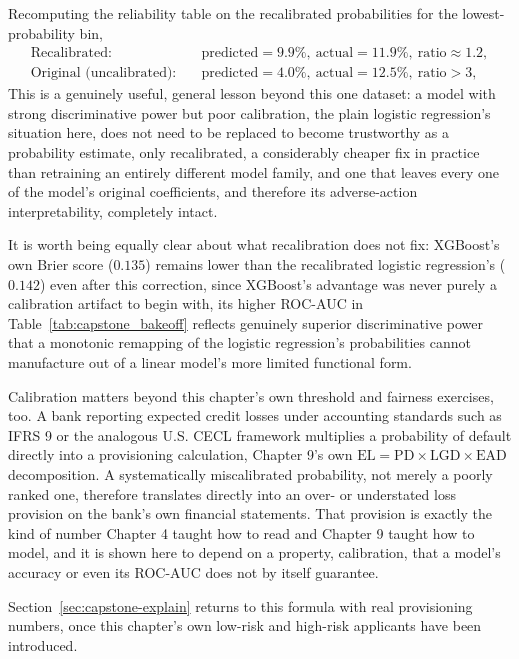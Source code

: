 \documentclass[../ai_in_finance]{subfiles}
\begin{document}
Recomputing the reliability table on the recalibrated probabilities for the lowest-probability bin,
\begin{align*}
\text{Recalibrated:} &\quad \text{predicted} = 9.9\%, \ \text{actual} = 11.9\%, \ \text{ratio} \approx 1.2, \\
\text{Original (uncalibrated):} &\quad \text{predicted} = 4.0\%, \ \text{actual} = 12.5\%, \ \text{ratio} > 3,
\end{align*} This is a genuinely useful, general lesson beyond this one dataset: a model with strong discriminative power but poor calibration, the plain logistic regression's situation here, does not need to be replaced to become trustworthy as a probability estimate, only recalibrated, a considerably cheaper fix in practice than retraining an entirely different model family, and one that leaves every one of the model's original coefficients, and therefore its adverse-action interpretability, completely intact.

It is worth being equally clear about what recalibration does not fix: XGBoost's own Brier score ($0.135$) remains lower than the recalibrated logistic regression's ($0.142$) even after this correction, since XGBoost's advantage was never purely a calibration artifact to begin with, its higher ROC-AUC in Table~\ref{tab:capstone_bakeoff} reflects genuinely superior discriminative power that a monotonic remapping of the logistic regression's probabilities cannot manufacture out of a linear model's more limited functional form.

Calibration matters beyond this chapter's own threshold and fairness exercises, too. A bank reporting expected credit losses under accounting standards such as IFRS 9 or the analogous U.S. CECL framework multiplies a probability of default directly into a provisioning calculation, Chapter 9's own $\text{EL} = \text{PD} \times \text{LGD} \times \text{EAD}$ decomposition. A systematically miscalibrated probability, not merely a poorly ranked one, therefore translates directly into an over- or understated loss provision on the bank's own financial statements. That provision is exactly the kind of number Chapter 4 taught how to read and Chapter 9 taught how to model, and it is shown here to depend on a property, calibration, that a model's accuracy or even its ROC-AUC does not by itself guarantee.

Section~\ref{sec:capstone-explain} returns to this formula with real provisioning numbers, once this chapter's own low-risk and high-risk applicants have been introduced.
\end{document}
